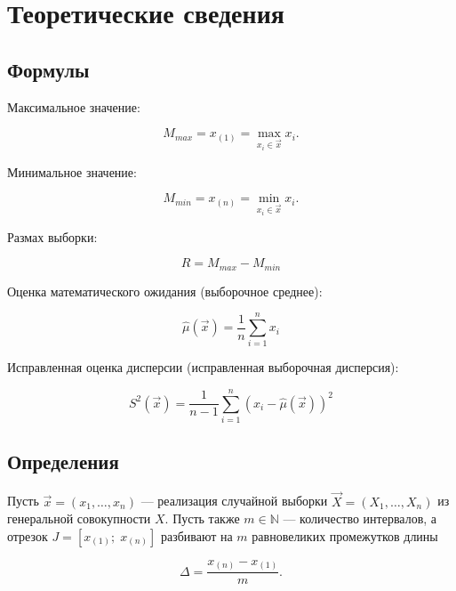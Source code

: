 \chapter{Теоретические сведения}

\section{Формулы}

Максимальное значение:

\begin{equation}\label{eq:mmax}
	M_{max} = x_{(1)} = \max\limits_{x_i \in \vec{x}} x_i.
\end{equation}

Минимальное значение:

\begin{equation}\label{eq:mmin}
	M_{min} = x_{(n)} = \min\limits_{x_i \in \vec{x}} x_i.
\end{equation}

Размах выборки:

\begin{equation}\label{eq:r}
	R = M_{max} - M_{min}
\end{equation}

Оценка математического ожидания (выборочное среднее):

\begin{equation}\label{eq:mu}
	\hat{\mu}(\vec{x}) = \frac{1}{n} \sum\limits_{i = 1}^{n} x_i
\end{equation}

Исправленная оценка дисперсии (исправленная выборочная дисперсия):

\begin{equation}\label{eq:s_quad}
	S^2(\vec{x}) = \frac{1}{n - 1} \sum\limits_{i = 1}^{n} (x_i - \hat{\mu}(\vec{x}))^2
\end{equation}

\section{Определения}

Пусть $\vec{x} = (x_1, \dots, x_n)$ --- реализация случайной выборки $\vec{X}=(X_1, \dots, X_n)$ из генеральной совокупности $X$.
Пусть также $m \in \mathbb{N}$ --- количество интервалов, а отрезок $J = [ x_{(1)}; \; x_{(n)} ]$ разбивают на $m$ равновеликих промежутков длины

\begin{equation}\label{eq:delta}
	\Delta = \frac{x_{(n)} -  x_{(1)}}{m}.
\end{equation}

